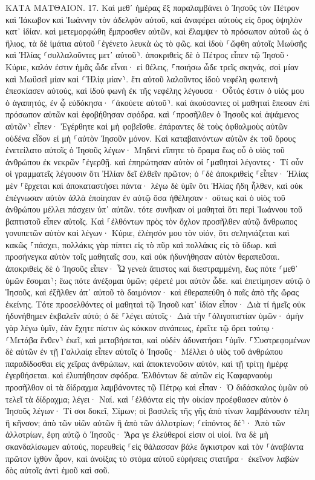 \documentclass[twoside, 9pt]{extreport}
\begin{document}
ΚΑΤΑ ΜΑΤΘΑΙΟΝ.
17.
Καὶ μεθ᾽ ἡμέρας ἓξ παραλαμβάνει ὁ Ἰησοῦς τὸν Πέτρον καὶ Ἰάκωβον καὶ Ἰωάννην τὸν ἀδελφὸν αὐτοῦ, καὶ ἀναφέρει αὐτοὺς εἰς ὄρος ὑψηλὸν κατ᾽ ἰδίαν. 
καὶ μετεμορφώθη ἔμπροσθεν αὐτῶν, καὶ ἔλαμψεν τὸ πρόσωπον αὐτοῦ ὡς ὁ ἥλιος, τὰ δὲ ἱμάτια αὐτοῦ ⸀ἐγένετο λευκὰ ὡς τὸ φῶς. 
καὶ ἰδοὺ ⸀ὤφθη αὐτοῖς Μωϋσῆς καὶ Ἠλίας ⸂συλλαλοῦντες μετ᾽ αὐτοῦ⸃. 
ἀποκριθεὶς δὲ ὁ Πέτρος εἶπεν τῷ Ἰησοῦ· Κύριε, καλόν ἐστιν ἡμᾶς ὧδε εἶναι· εἰ θέλεις, ⸀ποιήσω ὧδε τρεῖς σκηνάς, σοὶ μίαν καὶ Μωϋσεῖ μίαν καὶ ⸂Ἠλίᾳ μίαν⸃. 
ἔτι αὐτοῦ λαλοῦντος ἰδοὺ νεφέλη φωτεινὴ ἐπεσκίασεν αὐτούς, καὶ ἰδοὺ φωνὴ ἐκ τῆς νεφέλης λέγουσα· Οὗτός ἐστιν ὁ υἱός μου ὁ ἀγαπητός, ἐν ᾧ εὐδόκησα· ⸂ἀκούετε αὐτοῦ⸃. 
καὶ ἀκούσαντες οἱ μαθηταὶ ἔπεσαν ἐπὶ πρόσωπον αὐτῶν καὶ ἐφοβήθησαν σφόδρα. 
καὶ ⸂προσῆλθεν ὁ Ἰησοῦς καὶ ἁψάμενος αὐτῶν⸃ εἶπεν· Ἐγέρθητε καὶ μὴ φοβεῖσθε. 
ἐπάραντες δὲ τοὺς ὀφθαλμοὺς αὐτῶν οὐδένα εἶδον εἰ μὴ ⸀αὐτὸν Ἰησοῦν μόνον. 
Καὶ καταβαινόντων αὐτῶν ἐκ τοῦ ὄρους ἐνετείλατο αὐτοῖς ὁ Ἰησοῦς λέγων· Μηδενὶ εἴπητε τὸ ὅραμα ἕως οὗ ὁ υἱὸς τοῦ ἀνθρώπου ἐκ νεκρῶν ⸀ἐγερθῇ. 
καὶ ἐπηρώτησαν αὐτὸν οἱ ⸀μαθηταὶ λέγοντες· Τί οὖν οἱ γραμματεῖς λέγουσιν ὅτι Ἠλίαν δεῖ ἐλθεῖν πρῶτον; 
ὁ ⸀δὲ ἀποκριθεὶς ⸀εἶπεν· Ἠλίας μὲν ⸀ἔρχεται καὶ ἀποκαταστήσει πάντα· 
λέγω δὲ ὑμῖν ὅτι Ἠλίας ἤδη ἦλθεν, καὶ οὐκ ἐπέγνωσαν αὐτὸν ἀλλὰ ἐποίησαν ἐν αὐτῷ ὅσα ἠθέλησαν· οὕτως καὶ ὁ υἱὸς τοῦ ἀνθρώπου μέλλει πάσχειν ὑπ᾽ αὐτῶν. 
τότε συνῆκαν οἱ μαθηταὶ ὅτι περὶ Ἰωάννου τοῦ βαπτιστοῦ εἶπεν αὐτοῖς. 
Καὶ ⸀ἐλθόντων πρὸς τὸν ὄχλον προσῆλθεν αὐτῷ ἄνθρωπος γονυπετῶν αὐτὸν 
καὶ λέγων· Κύριε, ἐλέησόν μου τὸν υἱόν, ὅτι σεληνιάζεται καὶ κακῶς ⸀πάσχει, πολλάκις γὰρ πίπτει εἰς τὸ πῦρ καὶ πολλάκις εἰς τὸ ὕδωρ. 
καὶ προσήνεγκα αὐτὸν τοῖς μαθηταῖς σου, καὶ οὐκ ἠδυνήθησαν αὐτὸν θεραπεῦσαι. 
ἀποκριθεὶς δὲ ὁ Ἰησοῦς εἶπεν· Ὦ γενεὰ ἄπιστος καὶ διεστραμμένη, ἕως πότε ⸂μεθ᾽ ὑμῶν ἔσομαι⸃; ἕως πότε ἀνέξομαι ὑμῶν; φέρετέ μοι αὐτὸν ὧδε. 
καὶ ἐπετίμησεν αὐτῷ ὁ Ἰησοῦς, καὶ ἐξῆλθεν ἀπ᾽ αὐτοῦ τὸ δαιμόνιον· καὶ ἐθεραπεύθη ὁ παῖς ἀπὸ τῆς ὥρας ἐκείνης. 
Τότε προσελθόντες οἱ μαθηταὶ τῷ Ἰησοῦ κατ᾽ ἰδίαν εἶπον· Διὰ τί ἡμεῖς οὐκ ἠδυνήθημεν ἐκβαλεῖν αὐτό; 
ὁ δὲ ⸀λέγει αὐτοῖς· Διὰ τὴν ⸀ὀλιγοπιστίαν ὑμῶν· ἀμὴν γὰρ λέγω ὑμῖν, ἐὰν ἔχητε πίστιν ὡς κόκκον σινάπεως, ἐρεῖτε τῷ ὄρει τούτῳ· ⸂Μετάβα ἔνθεν⸃ ἐκεῖ, καὶ μεταβήσεται, καὶ οὐδὲν ἀδυνατήσει ⸀ὑμῖν. 
⸀Συστρεφομένων δὲ αὐτῶν ἐν τῇ Γαλιλαίᾳ εἶπεν αὐτοῖς ὁ Ἰησοῦς· Μέλλει ὁ υἱὸς τοῦ ἀνθρώπου παραδίδοσθαι εἰς χεῖρας ἀνθρώπων, 
καὶ ἀποκτενοῦσιν αὐτόν, καὶ τῇ τρίτῃ ἡμέρᾳ ἐγερθήσεται. καὶ ἐλυπήθησαν σφόδρα. 
Ἐλθόντων δὲ αὐτῶν εἰς Καφαρναοὺμ προσῆλθον οἱ τὰ δίδραχμα λαμβάνοντες τῷ Πέτρῳ καὶ εἶπαν· Ὁ διδάσκαλος ὑμῶν οὐ τελεῖ τὰ δίδραχμα; 
λέγει· Ναί. καὶ ⸀ἐλθόντα εἰς τὴν οἰκίαν προέφθασεν αὐτὸν ὁ Ἰησοῦς λέγων· Τί σοι δοκεῖ, Σίμων; οἱ βασιλεῖς τῆς γῆς ἀπὸ τίνων λαμβάνουσιν τέλη ἢ κῆνσον; ἀπὸ τῶν υἱῶν αὐτῶν ἢ ἀπὸ τῶν ἀλλοτρίων; 
⸂εἰπόντος δέ⸃· Ἀπὸ τῶν ἀλλοτρίων, ἔφη αὐτῷ ὁ Ἰησοῦς· Ἄρα γε ἐλεύθεροί εἰσιν οἱ υἱοί. 
ἵνα δὲ μὴ σκανδαλίσωμεν αὐτούς, πορευθεὶς ⸀εἰς θάλασσαν βάλε ἄγκιστρον καὶ τὸν ⸀ἀναβάντα πρῶτον ἰχθὺν ἆρον, καὶ ἀνοίξας τὸ στόμα αὐτοῦ εὑρήσεις στατῆρα· ἐκεῖνον λαβὼν δὸς αὐτοῖς ἀντὶ ἐμοῦ καὶ σοῦ. 
\end{document}
